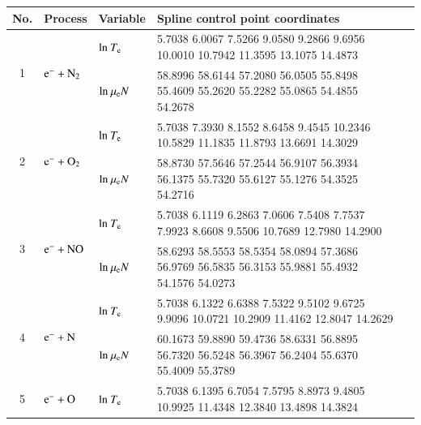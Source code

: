 \documentclass{warpdoc}
\renewcommand{\fontsizetable}{\footnotesize\scalefont{1.0}}
\begin{document}
\begin{table}[!htbp]
  \center\fontsizetable
  \begin{threeparttable}
    \label{tab:spline_tab}
    \fontsizetable
    \begin{tabular*}{\textwidth}{c@{\extracolsep{\fill}}llll}
    \toprule
   No. & Process & Variable & Spline control point coordinates  \\
        \midrule

  \multirow{2}{*}{1} &  \multirow{2}{*}{ $\rm e^- + N_2  $   } & ${\rm ln}~T_{\rm e}$  & \tiny 5.7038    6.0067    7.5266    9.0580    9.2866    9.6956   10.0010   10.7942   11.3595   13.1075   14.4873     \\
  &  & ${\rm ln}~\mu_{\rm e}N$     & \tiny  58.8996   58.6144   57.2080   56.0505   55.8498   55.4609   55.2620   55.2282   55.0865   54.4855   54.2678  \\
  \midrule  
  \multirow{2}{*}{2} &  \multirow{2}{*}{ $\rm e^- + O_2  $   } & ${\rm ln}~T_{\rm e}$  & \tiny     5.7038    7.3930    8.1552    8.6458    9.4545   10.2346   10.5829   11.1835   11.8793   13.6691   14.3029 \\
  &  & ${\rm ln}~\mu_{\rm e}N$     & \tiny  58.8730   57.5646   57.2544   56.9107   56.3934   56.1375   55.7320   55.6127   55.1276   54.3525   54.2716    \\
  \midrule 
  \multirow{2}{*}{3} &  \multirow{2}{*}{ $\rm e^- + NO  $   } & ${\rm ln}~T_{\rm e}$  & \tiny 5.7038    6.1119    6.2863    7.0606    7.5408    7.7537    7.9923    8.6608    9.5506   10.7689   12.7980   14.2900 \\
  &  & ${\rm ln}~\mu_{\rm e}N$     & \tiny  58.6293   58.5553   58.5354   58.0894   57.3686   56.9769   56.5835   56.3153   55.9881   55.4932   54.1576   54.0273 \\
  \midrule 
  \multirow{2}{*}{4} &  \multirow{2}{*}{ $\rm e^- + N  $   } & ${\rm ln}~T_{\rm e}$  & \tiny 5.7038    6.1322    6.6388    7.5322    9.5102    9.6725    9.9096   10.0721   10.2909   11.4162   12.8047   14.2629 \\
  &  & ${\rm ln}~\mu_{\rm e}N$   & \tiny 60.1673   59.8890   59.4736   58.6331   56.8895   56.7320   56.5248   56.3967   56.2404   55.6370   55.4009   55.3789 \\     
  \midrule  
  \multirow{2}{*}{5} &  \multirow{2}{*}{ $\rm e^- + O  $   } & ${\rm ln}~T_{\rm e}$  & \tiny 5.7038    6.1395    6.7054    7.5795    8.8973    9.4805   10.9925   11.4348   12.3840   13.4898   14.3824 \\

\end{tabular*}
\end{threeparttable}
\end{table}
\end{document}
